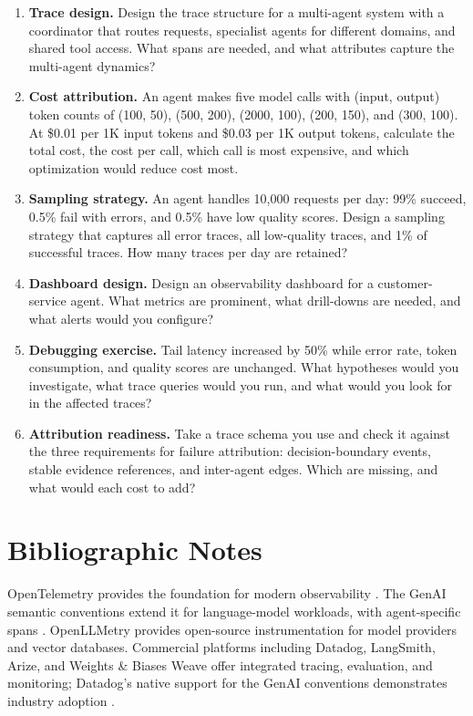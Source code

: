 \documentclass[11pt]{book}
\begin{document}
\begin{enumerate}
\item \textbf{Trace design.} Design the trace structure for a multi-agent system with a coordinator that routes requests, specialist agents for different domains, and shared tool access. What spans are needed, and what attributes capture the multi-agent dynamics?

\item \textbf{Cost attribution.} An agent makes five model calls with (input, output) token counts of (100, 50), (500, 200), (2000, 100), (200, 150), and (300, 100). At \$0.01 per 1K input tokens and \$0.03 per 1K output tokens, calculate the total cost, the cost per call, which call is most expensive, and which optimization would reduce cost most.

\item \textbf{Sampling strategy.} An agent handles 10{,}000 requests per day: 99\% succeed, 0.5\% fail with errors, and 0.5\% have low quality scores. Design a sampling strategy that captures all error traces, all low-quality traces, and 1\% of successful traces. How many traces per day are retained?

\item \textbf{Dashboard design.} Design an observability dashboard for a customer-service agent. What metrics are prominent, what drill-downs are needed, and what alerts would you configure?

\item \textbf{Debugging exercise.} Tail latency increased by 50\% while error rate, token consumption, and quality scores are unchanged. What hypotheses would you investigate, what trace queries would you run, and what would you look for in the affected traces?

\item \textbf{Attribution readiness.} Take a trace schema you use and check it against the three requirements for failure attribution: decision-boundary events, stable evidence references, and inter-agent edges. Which are missing, and what would each cost to add?
\end{enumerate}

\section*{Bibliographic Notes}

OpenTelemetry provides the foundation for modern observability \cite{otel2025}. The GenAI semantic conventions extend it for language-model workloads, with agent-specific spans \cite{otelgenai2025}. OpenLLMetry \cite{openllmetry2025} provides open-source instrumentation for model providers and vector databases. Commercial platforms including Datadog, LangSmith, Arize, and Weights \& Biases Weave offer integrated tracing, evaluation, and monitoring; Datadog's native support for the GenAI conventions demonstrates industry adoption \cite{datadoggenai2025}.
\end{document}
